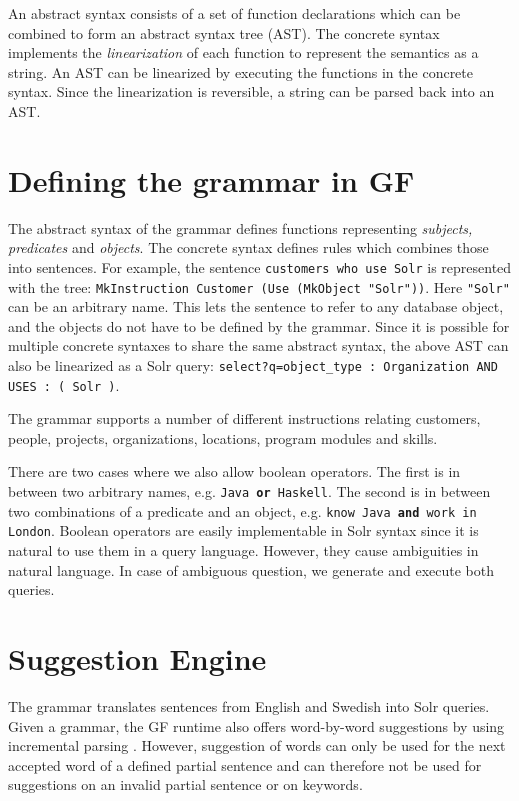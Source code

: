 \documentclass[10pt, a4paper]{article}
\begin{document}
An abstract syntax consists of a set of function declarations 
which can be combined to form an abstract syntax tree (AST). 
The concrete syntax implements the \emph{linearization} of each function
to represent the semantics as a string. An AST can be linearized 
by executing the functions in the concrete syntax. Since the
linearization is reversible, a string can be parsed back into an AST.

\section{Defining the grammar in GF}
The abstract syntax of the grammar defines functions representing
\emph{subjects, predicates} and \emph{objects}. The concrete
syntax defines rules which combines those into sentences. 
For example, the sentence \texttt{customers who use Solr} is represented
with the tree: \texttt{MkInstruction Customer (Use (MkObject "Solr"))}.
Here \texttt{"Solr"} can be an arbitrary name. This lets the sentence
to refer to any database object, and the objects do not have to be defined by the grammar.
Since it is possible for multiple concrete syntaxes to share the
same abstract syntax, the above AST can also be linearized as
a Solr query: \texttt{select?q=object\_type : Organization AND USES : ( Solr )}.

The grammar supports a number of different instructions relating customers, 
people, projects, organizations, locations, program modules and skills.

There are two cases where we also allow boolean operators. 
The first is in between two arbitrary names, e.g. 
\texttt{Java \textbf{or} Haskell}. The second is in between 
two combinations of a predicate and an object, 
e.g. \texttt{know Java \textbf{and} work in London}. Boolean operators 
are easily implementable in Solr syntax since it is natural to use them
in a query language. However, they cause ambiguities in natural language.
In case of ambiguous question, we generate and execute both queries.

\section{Suggestion Engine}
The grammar translates sentences from English and Swedish into Solr queries.
Given a grammar, the GF runtime also offers word-by-word suggestions 
by using incremental parsing \cite{angelov:2009}. However, suggestion of 
words can only be used for the next accepted word of 
a defined partial sentence and can therefore not be used for suggestions
on an invalid partial sentence or on keywords.
\end{document}
